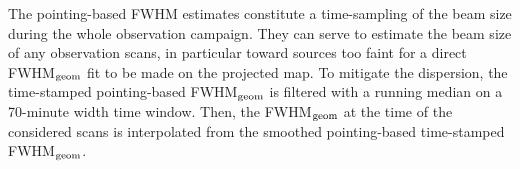 %
%
The pointing-based FWHM estimates constitute a time-sampling of the
beam size during
the whole observation campaign. They can serve to estimate the beam
size of any observation scans, in particular
toward sources too faint for a direct FWHM$_{\rm{geom}}$ fit to be made on the
projected map. To mitigate the dispersion, the time-stamped
pointing-based FWHM$_{\rm{geom}}$ is filtered with a running median on a 70-minute
width time window. Then, the FWHM$_{\rm{geom}}$ at the time of the considered scans is
interpolated from the smoothed pointing-based time-stamped FWHM$_{\rm{geom}}$.
%
